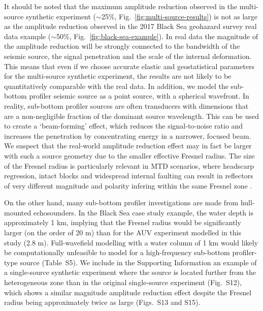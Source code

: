 \documentclass[se,manuscript]{copernicus}
\begin{document}
It should be noted that the maximum amplitude reduction observed in the multi-source synthetic experiment ($\sim$25\%, Fig.~\ref{fig:multi-source-results}) is not as large as the amplitude reduction observed in the 2017 Black Sea geohazard survey real data example ($\sim$50\%, Fig.~\ref{fig:black-sea-example}).
In real data the magnitude of the amplitude reduction will be strongly connected to the bandwidth of the seismic source, the signal penetration and the scale of the internal deformation.
This means that even if we choose accurate elastic and geostatistical parameters for the multi-source synthetic experiment, the results are not likely to be quantitatively comparable with the real data.
In addition, we model the sub-bottom profiler seismic source as a point source, with a spherical wavefront.
In reality, sub-bottom profiler sources are often transducers with dimensions that are a non-negligible fraction of the dominant source wavelength.
This can be used to create a ‘beam-forming’ effect, which reduces the signal-to-noise ratio and increases the penetration by concentrating energy in a narrower, focused beam.
We suspect that the real-world amplitude reduction effect may in fact be larger with such a source geometry due to the smaller effective Fresnel radius.
The size of the Fresnel radius is particularly relevant in MTD scenarios, where headscarp regression, intact blocks and widespread internal faulting can result in reflectors of very different magnitude and polarity infering within the same Fresnel zone \citep[e.g.,][]{sammartini_propagation_2021}.

On the other hand, many sub-bottom profiler investigations are made from hull-mounted echosounders.
In the Black Sea case study example, the water depth is approximately 1 \unit{km}, implying that the Fresnel radius would be significantly larger (on the order of 20 \unit{m}) than for the AUV experiment modelled in this study (2.8 \unit{m}).
Full-wavefield modelling with a water column of 1 \unit{km} would likely be computationally unfeasible to model for a high-frequency sub-bottom profiler-type source (Table~S5).
We include in the Supporting Information an example of a single-source synthetic experiment where the source is located further from the heterogeneous zone than in the original single-source experiment (Fig.~S12), which shows a similar magnitude amplitude reduction effect despite the Fresnel radius being approximately twice as large (Figs.~S13 and S15).
\end{document}
